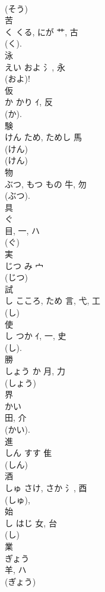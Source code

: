 \documentclass[8pt]{extreport}
\begin{document}
\begin{CJK}{UTF8}{min}
\\	(そう) 
\\	苦	
\\	く	くる, にが	艹, 古	
\\	(く).	
\\	泳	
\\	えい	およ	氵, 永	
\\	(およ)! 
\\	仮	
\\	か	かり	ｲ, 反	
\\	(か). 
\\	験	
\\	けん	ため, ためし	馬		
\\	(けん) 
\\	(けん) 
\\	物	
\\	ぶつ, もつ	もの	牛, 勿	
\\	(ぶつ). 
\\	具	
\\	ぐ	
\\	目, 一, ハ	
\\	(ぐ) 
\\	実	
\\	じつ	み	宀		
\\	(じつ) 
\\	試	
\\	し	こころ, ため	言, 弋, 工	
\\	(し) 
\\	使	
\\	し	つか	ｲ, 一, 史	
\\	(し). 
\\	勝	
\\	しょう	か	月, 力		
\\	(しょう) 
\\	界	
\\	かい	
\\	田, 介	
\\	(かい).	
\\	進	
\\	しん	すす	隹		
\\	(しん) 
\\	酒	
\\	しゅ	さけ, さか	氵, 酉	
\\	(しゅ), 
\\	始	
\\	し	はじ	女, 台	
\\	(し) 
\\	業	
\\	ぎょう	
\\	羊, ハ		
\\	(ぎょう) 

\end{CJK}
\end{document}
